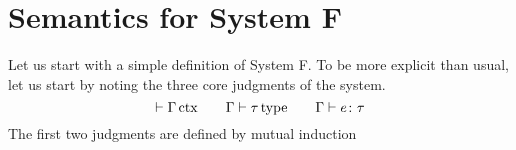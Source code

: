 \section{Semantics for System F}

Let us start with a simple definition of System F. To be more explicit
than usual, let us start by noting the three core judgments of the
system.
\[
  \vdash \Gamma\,\mathrm{ctx} \qquad \Gamma \vdash \tau\,\mathrm{type} \qquad \Gamma \vdash e \colon \tau
\]
The first two judgments are defined by mutual induction
